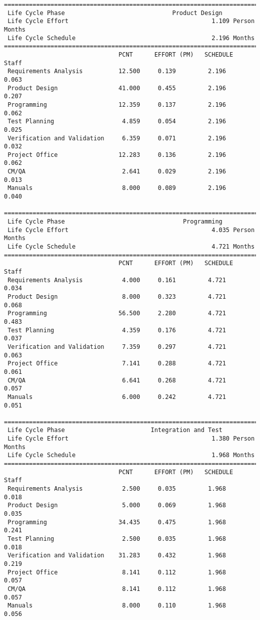 \documentclass[11pt,a4paper,spanish,twoside]{report}
\begin{document}
{\begin{verbatim}
==============================================================================
 Life Cycle Phase                              Product Design
 Life Cycle Effort                                        1.109 Person Months
 Life Cycle Schedule                                      2.196 Months
==============================================================================
                                PCNT      EFFORT (PM)   SCHEDULE       Staff   
 Requirements Analysis          12.500     0.139         2.196        0.063
 Product Design                 41.000     0.455         2.196        0.207
 Programming                    12.359     0.137         2.196        0.062
 Test Planning                   4.859     0.054         2.196        0.025
 Verification and Validation     6.359     0.071         2.196        0.032
 Project Office                 12.283     0.136         2.196        0.062
 CM/QA                           2.641     0.029         2.196        0.013
 Manuals                         8.000     0.089         2.196        0.040

==============================================================================
 Life Cycle Phase                                 Programming
 Life Cycle Effort                                        4.035 Person Months
 Life Cycle Schedule                                      4.721 Months
==============================================================================
                                PCNT      EFFORT (PM)   SCHEDULE       Staff   
 Requirements Analysis           4.000     0.161         4.721        0.034
 Product Design                  8.000     0.323         4.721        0.068
 Programming                    56.500     2.280         4.721        0.483
 Test Planning                   4.359     0.176         4.721        0.037
 Verification and Validation     7.359     0.297         4.721        0.063
 Project Office                  7.141     0.288         4.721        0.061
 CM/QA                           6.641     0.268         4.721        0.057
 Manuals                         6.000     0.242         4.721        0.051

==============================================================================
 Life Cycle Phase                        Integration and Test
 Life Cycle Effort                                        1.380 Person Months
 Life Cycle Schedule                                      1.968 Months
==============================================================================
                                PCNT      EFFORT (PM)   SCHEDULE       Staff   
 Requirements Analysis           2.500     0.035         1.968        0.018
 Product Design                  5.000     0.069         1.968        0.035
 Programming                    34.435     0.475         1.968        0.241
 Test Planning                   2.500     0.035         1.968        0.018
 Verification and Validation    31.283     0.432         1.968        0.219
 Project Office                  8.141     0.112         1.968        0.057
 CM/QA                           8.141     0.112         1.968        0.057
 Manuals                         8.000     0.110         1.968        0.056


\end{verbatim}}
\end{document}
